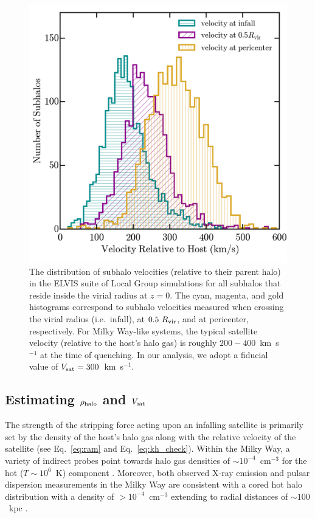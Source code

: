 \begin{figure}
 \centering
 \hspace*{-0.07in}
 \includegraphics[width=6in]{underpressure/f1.png}
 \caption[Subhalo Velocity Distributions in ELVIS]{The distribution of subhalo velocities (relative to their
   parent halo) in the ELVIS suite of Local Group simulations for all
   subhalos that reside inside the virial radius at $z = 0$. The cyan,
   magenta, and gold histograms correspond to
   subhalo velocities measured when crossing the virial radius
   (i.e.~infall), at $0.5~R_{\rm vir}$, and at pericenter,
   respectively. For Milky Way-like systems, the typical satellite
   velocity (relative to the host's halo gas) is roughly
   $200-400$~km~s$^{-1}$ at the time of quenching. In our analysis, we
   adopt a fiducial value of $V_{\rm sat} = 300$~km~s$^{-1}$.}
 \label{fig:vel}
\end{figure}

\subsection{Estimating \boldmath$\rho_{\rm halo}$ and \boldmath$V_{\rm sat}$}
\label{subsec:rhoV}

The strength of the stripping force acting upon an infalling satellite is
primarily set by the density of the host's halo gas along with the
relative velocity of the satellite (see Eq.~\ref{eq:ram} and Eq.~\ref{eq:kh_check}).
%
Within the Milky Way, a variety of indirect probes point towards halo
gas densities of $\sim 10^{-4}$~cm$^{-3}$ for the hot
($T\sim10^{6}$~K) component \citep[e.g.][]{weiner96, snez02, fox05,
  grcevich09, salem15}.
%
Moreover, both observed X-ray emission and pulsar dispersion
measurements in the Milky Way are consistent with a cored hot halo
distribution with a density of $> 10^{-4}$~cm$^{-3}$
extending to radial distances of $\sim100$~kpc \citep[][see also
\citealt{anderson10, gupta12, miller13, miller15, fsm16}]{fang13}.
%

